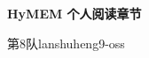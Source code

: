 \documentclass{jos}
\begin{document}
\raggedbottom
\begin{center}
{\Large\bfseries HyMEM 个人阅读章节}\par
第8队\quad lanshuheng9-oss
\end{center}



\end{document}
